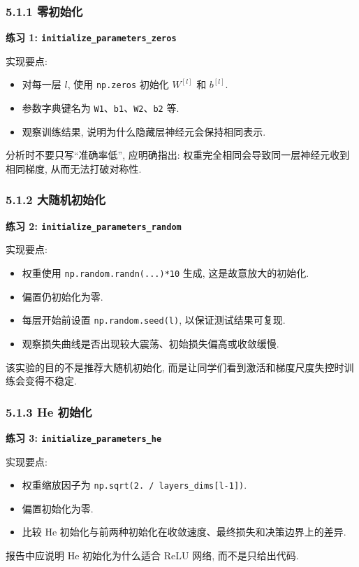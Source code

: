 \documentclass{../../nndlcourse}
\begin{document}
\subsubsection*{5.1.1 零初始化}

\textbf{练习 1: \texttt{initialize\_parameters\_zeros}}

实现要点:
\begin{itemize}
    \item 对每一层 $l$, 使用 \texttt{np.zeros} 初始化 $W^{[l]}$ 和 $b^{[l]}$.
    \item 参数字典键名为 \texttt{W1}、\texttt{b1}、\texttt{W2}、\texttt{b2} 等.
    \item 观察训练结果, 说明为什么隐藏层神经元会保持相同表示.
\end{itemize}
分析时不要只写``准确率低'', 应明确指出: 权重完全相同会导致同一层神经元收到相同梯度, 从而无法打破对称性.

\subsubsection*{5.1.2 大随机初始化}

\textbf{练习 2: \texttt{initialize\_parameters\_random}}

实现要点:
\begin{itemize}
    \item 权重使用 \texttt{np.random.randn(...)*10} 生成, 这是故意放大的初始化.
    \item 偏置仍初始化为零.
    \item 每层开始前设置 \texttt{np.random.seed(l)}, 以保证测试结果可复现.
    \item 观察损失曲线是否出现较大震荡、初始损失偏高或收敛缓慢.
\end{itemize}
该实验的目的不是推荐大随机初始化, 而是让同学们看到激活和梯度尺度失控时训练会变得不稳定.

\subsubsection*{5.1.3 He 初始化}

\textbf{练习 3: \texttt{initialize\_parameters\_he}}

实现要点:
\begin{itemize}
    \item 权重缩放因子为 \texttt{np.sqrt(2. / layers\_dims[l-1])}.
    \item 偏置初始化为零.
    \item 比较 He 初始化与前两种初始化在收敛速度、最终损失和决策边界上的差异.
\end{itemize}
报告中应说明 He 初始化为什么适合 ReLU 网络, 而不是只给出代码.
\end{document}
